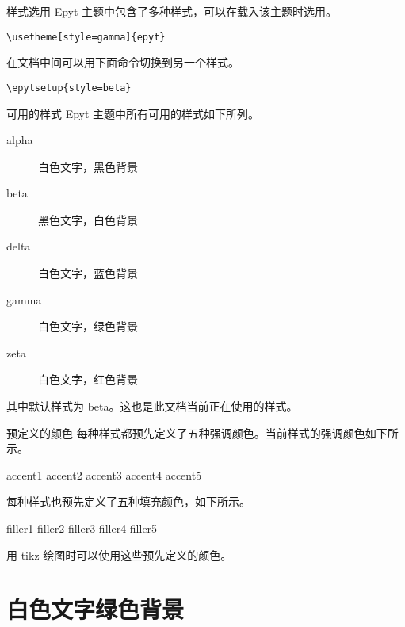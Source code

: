 \documentclass[14pt,notheorems,xcolor={rgb}]{beamer}
\newcommand{\mylead}[1]{\textcolor{accent1}{#1}}
\newcommand{\mybold}[1]{\textcolor{accent2}{#1}}
\begin{document}
\begin{frame}[fragile]{样式选用}
\mylead{Epyt} 主题中包含了多种样式，可以在载入该主题时选用。
\begin{lstlisting}
\usetheme[style=gamma]{epyt}
\end{lstlisting}
\pause 在文档中间可以用下面命令切换到另一个样式。
\begin{lstlisting}
\epytsetup{style=beta}
\end{lstlisting}
\end{frame}

\begin{frame}{可用的样式}
\mylead{Epyt} 主题中所有可用的样式如下所列。
\begin{description}
  \item[alpha] 白色文字，黑色背景
  \item[beta]  黑色文字，白色背景
  \item[delta] 白色文字，蓝色背景
  \item[gamma] 白色文字，绿色背景
  \item[zeta]  白色文字，红色背景
\end{description}
\pause
其中默认样式为 \mybold{beta}。这也是此文档当前正在使用的样式。
\end{frame}

\begin{frame}{预定义的颜色}
每种样式都预先定义了五种强调颜色。当前样式的强调颜色如下所示。
\begin{flushleft}
\textcolor{accent1}{accent1}
\textcolor{accent2}{accent2}
\textcolor{accent3}{accent3}
\textcolor{accent4}{accent4}
\textcolor{accent5}{accent5}
\end{flushleft}
\pause 每种样式也预先定义了五种填充颜色，如下所示。
\begin{flushleft}
\colorbox{filler1}{filler1}
\colorbox{filler2}{filler2}
\colorbox{filler3}{filler3}
\colorbox{filler4}{filler4}
\colorbox{filler5}{filler5}
\end{flushleft}
\pause 用 tikz 绘图时可以使用这些预先定义的颜色。
\end{frame}


\begin{frame}[plain]\transboxout
\titlepage
\end{frame}

\section{白色文字绿色背景}
\end{document}
